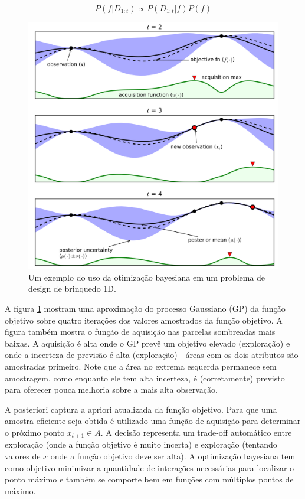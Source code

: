 \documentclass[
	12pt,				%
	a4paper,		%
	oneside,    %
	chapter=TITLE,		   %
	section=TITLE,		   %
	subsection=TITLE,	   %
	subsubsection=TITLE, %
	english,			%
	french,				%
	spanish,			%
	brazil,				%
]{abntex2}
\begin{document}
\[
P(f|D_{1:t}) \propto P(D_{1:t}|f)P(f)
\]

\begin{figure}
\centering
\includegraphics[width=\textwidth,height=0.5\textheight]{fig/bo.png}
\caption{Um exemplo do uso da otimização bayesiana em um problema de
design de brinquedo 1D.\label{bo}}
\end{figure}

A figura \ref{bo} mostram uma aproximação do processo Gaussiano (GP) da
função objetivo sobre quatro iterações dos valores amostrados da função
objetivo. A figura também mostra o função de aquisição nas parcelas
sombreadas mais baixas. A aquisição é alta onde o GP prevê um objetivo
elevado (exploração) e onde a incerteza de previsão é alta (exploração)
- áreas com os dois atributos são amostradas primeiro. Note que a área
no extrema esquerda permanece sem amostragem, como enquanto ele tem alta
incerteza, é (corretamente) previsto para oferecer pouca melhoria sobre
a mais alta observação.

A posteriori captura a apriori atualizada da função objetivo. Para que
uma amostra eficiente seja obtida é utilizado uma função de aquisição
para determinar o próximo ponto \(x_{t+1} \in A\). A decisão representa
um trade-off automático entre exploração (onde a função objetivo é muito
incerta) e exploração (tentando valores de \(x\) onde a função objetivo
deve ser alta). A optimização bayesiana tem como objetivo minimizar a
quantidade de interações necessárias para localizar o ponto máximo e
também se comporte bem em funções com múltiplos pontos de máximo.\\
~\\
\end{document}
